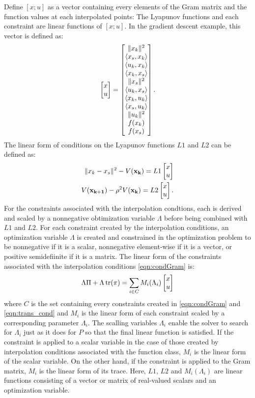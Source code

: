 Define $[x; u]$ as a vector containing every elements of the Gram matrix and the function values at each interpolated points: The Lyapunov functions and each constraint are linear functions of $[x; u]$. In the gradient descent example, this vector is defined as:
\begin{equation} \label{eqn:xu}
	\begin{bmatrix}x\\ u\end{bmatrix} = \begin{bmatrix}\|x_k\|^2 \\ \langle x_s, x_k \rangle \\ \langle u_k, x_k \rangle \\ \langle x_k, x_s \rangle \\ \|x_s\|^2 \\ \langle u_k, x_s \rangle \\ \langle x_k, u_k \rangle \\ \langle x_s, u_k \rangle \\ \|u_k\|^2 \\ f(x_k) \\ f(x_s)\end{bmatrix}.
\end{equation}
The linear form of conditions on the Lyapunov functions $L1$ and $L2$ can be defined as:
\begin{subequations}
	\begin{align}
		\|x_k - x_s\|^2 - V(\mathbf{x_k}) = L1\begin{bmatrix}x\\ u\end{bmatrix}\\
		V(\mathbf{x_{k+1}}) - \rho ^2V(\mathbf{x_k}) = L2\begin{bmatrix}x\\ u\end{bmatrix}.
	\end{align}
\end{subequations}
For the constraints associated with the interpolation condtions, each is derived and scaled by a nonnegative obtimization variable $\Lambda$ before being combined with $L1$ and $L2$. For each constraint created by the interpolation conditions, an optimization variable $\Lambda $ is created and constrained in the optimization problem to be nonnegative if it is a scalar, nonnegative element-wise if it is a vector, or positive semidefiinite if it is a matrix. The linear form of the constraints associated with the interpolation conditions \eqref{eqn:condGram} is:
\begin{equation}
	\Lambda \Pi + \Lambda \operatorname{\mathrm{tr}}(\pi) = \sum_{i \in C}M_i(\Lambda_i)\begin{bmatrix}x\\u\end{bmatrix}
\end{equation}
where $C$ is the set containing every constraints created in \eqref{eqn:condGram} and \eqref{eqn:trans_cond} and $M_i$ is the linear form of each constraint scaled by a corresponding parameter $\Lambda _i$. The scalling variables $\Lambda _i$ enable the solver to search for $\Lambda _i$ just as it does for $P$ so that the final linear function is satisfied. If the constraint is applied to a scalar variable in the case of those created by interpolation conditions associated with the function class, $M_i$ is the linear form of the scalar variable. On the other hand, if the constraint is applied to the Gram matrix, $M_i$ is the linear form of its trace. Here, $L1$, $L2$ and $M_i(\Lambda_i)$ are linear functions consisting of a vector or matrix of real-valued scalars and an optimization variable.

